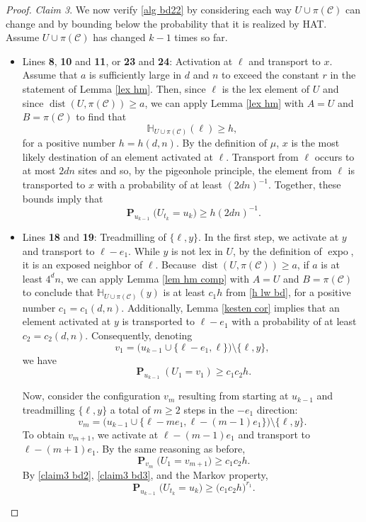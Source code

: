 \documentclass[11pt,reqno]{amsart}
\theoremstyle{definition}
\numberwithin{equation}{section}
\newcommand{\1}{\mathbf{1}}
\renewcommand{\H}{\mathbb{H}}
\DeclareMathOperator{\dist}{dist}
\DeclareMathOperator{\PP}{\mathbf{P}}
\newcommand{\CC}{\mathcal{C}}
\DeclareMathOperator{\expo}{\mathrm{expo}}
\begin{document}
\begin{proof}
{\em Claim 3}. We now verify \eqref{alg bd22} by considering each way $U \cup \pi (\CC)$ can change and by bounding below the probability that it is realized by HAT. Assume $U \cup \pi (\CC)$ has changed $k-1$ times so far.
\begin{itemize}
\item Lines {\bf 8}, {\bf 10} and {\bf 11}, or {\bf 23} and {\bf 24}: Activation at $\ell$ and transport to $x$. Assume that $a$ is sufficiently large in $d$ and $n$ to exceed the constant $r$ in the statement of Lemma \ref{lex hm}. Then, since $\ell$ is the lex element of $U$ and since $\dist (U, \pi (\CC)) \geq a$, we can apply Lemma \ref{lex hm} with $A = U$ and $B = \pi (\CC)$ to find that
\begin{equation}\label{h lw bd} 
\H_{U \cup \pi (\CC)}(\ell) \geq h,
\end{equation}
for a positive number $h = h(d,n)$. By the definition of $\mu$, $x$ is the most likely destination of an element activated at $\ell$. Transport from $\ell$ occurs to at most $2dn$ sites and so, by the pigeonhole principle, the element from $\ell$ is transported to $x$ with a probability of at least $(2dn)^{-1}$. Together, these bounds imply that
\begin{equation}\label{claim3 bd1}
\PP_{u_{k-1}} \big( U_{t_k} = u_k \big) \geq h (2dn)^{-1}.
\end{equation}
\item Lines {\bf 18} and {\bf 19}: Treadmilling of $\{\ell,y\}$. In the first step, we activate at $y$ and transport to $\ell-e_1$. While $y$ is not lex in $U$, by the definition of $\expo$, it is an exposed neighbor of $\ell$. Because $\dist (U, \pi (\CC)) \geq a$, if $a$ is at least $4^d n$, we can apply Lemma \ref{lem hm comp} with $A = U$ and $B = \pi (\CC)$ to conclude that $\H_{U \cup \pi (\CC)} (y)$ is at least $c_1 h$ from \eqref{h lw bd}, for a positive number $c_1 = c_1 (d,n)$. Additionally, Lemma \ref{kesten cor} implies that an element activated at $y$ is transported to $\ell-e_1$ with a probability of at least $c_2 = c_2 (d,n)$. Consequently, denoting
\[
v_1 = \big( u_{k-1} \cup \{\ell-e_1,\ell\} \big) {\setminus} \{\ell,y\},
\]
we have
\begin{equation}\label{claim3 bd2}
\PP_{u_{k-1}} (U_1 = v_1) \geq c_1 c_2 h.
\end{equation}

Now, consider the configuration $v_m$ resulting from starting at $u_{k-1}$ and treadmilling $\{\ell,y\}$ a total of $m \geq 2$ steps in the $-e_1$ direction:
\[ v_m = \big( u_{k-1} \cup \{\ell-me_1, \ell - (m-1)e_1\} \big) {\setminus} \{\ell,y\}.\]
To obtain $v_{m+1}$, we activate at $\ell-(m-1)e_1$ and transport to $\ell-(m+1)e_1$. By the same reasoning as before,
\begin{equation}\label{claim3 bd3}
\PP_{v_m} \big( U_1 = v_{m+1} \big) \geq c_1c_2 h.
\end{equation}
By \eqref{claim3 bd2}, \eqref{claim3 bd3}, and the Markov property,
\begin{equation}\label{claim3 bd4}
\PP_{u_{k-1}} \big( U_{t_k} = u_k \big) \geq \big(c_1 c_2 h \big)^{r_1}.
\end{equation}
\end{itemize}


\end{proof}
\end{document}
